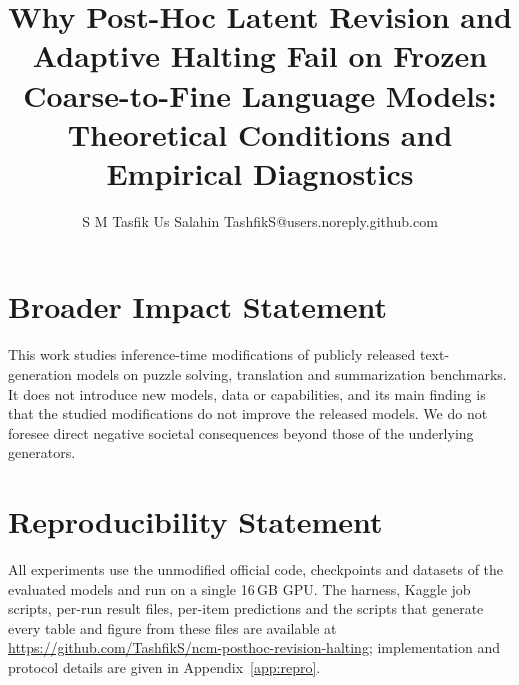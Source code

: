 \documentclass[10pt]{article}
\title{Why Post-Hoc Latent Revision and Adaptive Halting Fail on Frozen Coarse-to-Fine Language Models: Theoretical Conditions and Empirical Diagnostics}
\author{\name S M Tasfik Us Salahin \email TashfikS@users.noreply.github.com}
\begin{document}
\maketitle





\section*{Broader Impact Statement}
This work studies inference-time modifications of publicly released text-generation models on puzzle solving, translation and summarization benchmarks. It does not introduce new models, data or capabilities, and its main finding is that the studied modifications do not improve the released models. We do not foresee direct negative societal consequences beyond those of the underlying generators.

\section*{Reproducibility Statement}
All experiments use the unmodified official code, checkpoints and datasets of the evaluated models and run on a single 16\,GB GPU. The harness, Kaggle job scripts, per-run result files, per-item predictions and the scripts that generate every table and figure from these files are available at \url{https://github.com/TashfikS/ncm-posthoc-revision-halting}; implementation and protocol details are given in Appendix~\ref{app:repro}.




\appendix


\end{document}
